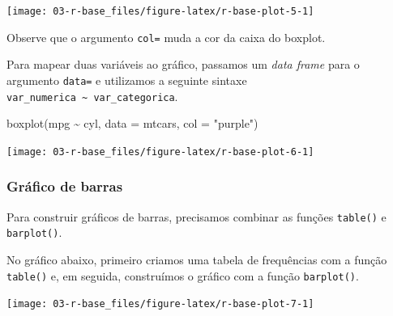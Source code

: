 \documentclass[
]{book}
\newenvironment{Shaded}{\begin{snugshade}}{\end{snugshade}}
\newcommand{\AttributeTok}[1]{\textcolor[rgb]{0.77,0.63,0.00}{#1}}
\newcommand{\DocumentationTok}[1]{\textcolor[rgb]{0.56,0.35,0.01}{\textbf{\textit{#1}}}}
\newcommand{\FunctionTok}[1]{\textcolor[rgb]{0.00,0.00,0.00}{#1}}
\newcommand{\NormalTok}[1]{#1}
\newcommand{\OtherTok}[1]{\textcolor[rgb]{0.56,0.35,0.01}{#1}}
\newcommand{\SpecialCharTok}[1]{\textcolor[rgb]{0.00,0.00,0.00}{#1}}
\newcommand{\StringTok}[1]{\textcolor[rgb]{0.31,0.60,0.02}{#1}}
\begin{document}
\begin{center}\texttt{[image: 03-r-base\_files/figure-latex/r-base-plot-5-1]} \end{center}

Observe que o argumento \texttt{col=} muda a cor da caixa do boxplot.

Para mapear duas variáveis ao gráfico, passamos um \emph{data frame} para o argumento \texttt{data=} e utilizamos a seguinte sintaxe \texttt{var\_numerica\ \textasciitilde{}\ var\_categorica}.

\begin{Shaded}
\begin{Highlighting}[]
\FunctionTok{boxplot}\NormalTok{(mpg }\SpecialCharTok{\textasciitilde{}}\NormalTok{ cyl, }\AttributeTok{data =}\NormalTok{ mtcars, }\AttributeTok{col =} \StringTok{"purple"}\NormalTok{)}
\end{Highlighting}
\end{Shaded}

\begin{center}\texttt{[image: 03-r-base\_files/figure-latex/r-base-plot-6-1]} \end{center}

\hypertarget{gruxe1fico-de-barras}{%
\subsubsection*{Gráfico de barras}\label{gruxe1fico-de-barras}}

Para construir gráficos de barras, precisamos combinar as funções \texttt{table()} e \texttt{barplot()}.

No gráfico abaixo, primeiro criamos uma tabela de frequências com a função \texttt{table()} e, em seguida, construímos o gráfico com a função \texttt{barplot()}.

\begin{Shaded}
\end{Shaded}

\begin{center}\texttt{[image: 03-r-base\_files/figure-latex/r-base-plot-7-1]} \end{center}
\end{document}
